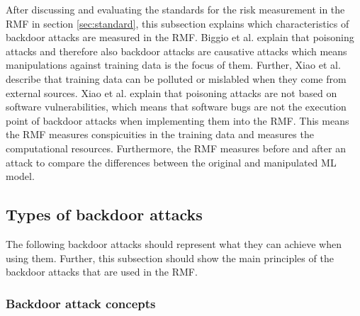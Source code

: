 After discussing and evaluating the standards for the risk measurement in the RMF in section \ref{sec:standard}, this subsection explains which characteristics of backdoor attacks are measured in the
RMF. Biggio et al. \cite{DBLP:conf/icml/BiggioNL12} explain that poisoning attacks and therefore also backdoor attacks are causative attacks which means manipulations against training data is the focus of them. Further, Xiao et al. \cite{DBLP:conf/sp/XiaoLZX18} describe that training data can be polluted or mislabled when they come from external sources. Xiao et al. explain that poisoning attacks are not based on software vulnerabilities, which means that software bugs are not the execution point of backdoor attacks when implementing them into the RMF. This means the RMF measures conspicuities in the training data and measures the computational resources. Furthermore, the RMF measures before and after an attack to compare the differences between the original and manipulated ML model.

\subsection{Types of backdoor attacks}
\label{sec:backdoor_types}

The following backdoor attacks should represent what they can achieve when using them. Further, this subsection should show the main principles of the backdoor attacks that are used in the RMF.

\subsubsection*{Backdoor attack concepts}

